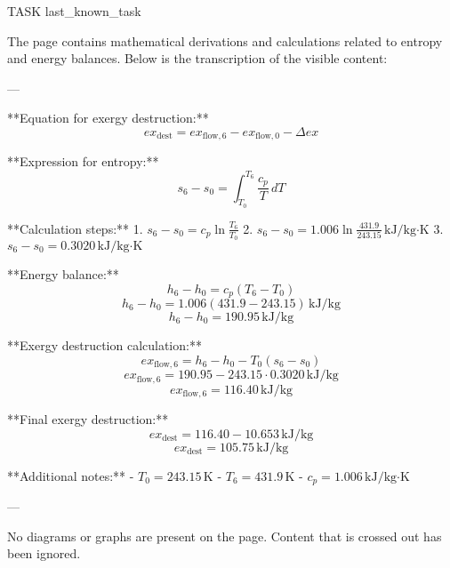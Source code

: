 TASK {last_known_task}

The page contains mathematical derivations and calculations related to entropy and energy balances. Below is the transcription of the visible content:

---

**Equation for exergy destruction:**
\[
ex_{\text{dest}} = ex_{\text{flow},6} - ex_{\text{flow},0} - \Delta ex
\]

**Expression for entropy:**
\[
s_6 - s_0 = \int_{T_0}^{T_6} \frac{c_p}{T} \, dT
\]

**Calculation steps:**
1. \( s_6 - s_0 = c_p \ln \frac{T_6}{T_0} \)
2. \( s_6 - s_0 = 1.006 \ln \frac{431.9}{243.15} \, \text{kJ/kg·K} \)
3. \( s_6 - s_0 = 0.3020 \, \text{kJ/kg·K} \)

**Energy balance:**
\[
h_6 - h_0 = c_p (T_6 - T_0)
\]
\[
h_6 - h_0 = 1.006 (431.9 - 243.15) \, \text{kJ/kg}
\]
\[
h_6 - h_0 = 190.95 \, \text{kJ/kg}
\]

**Exergy destruction calculation:**
\[
ex_{\text{flow},6} = h_6 - h_0 - T_0 (s_6 - s_0)
\]
\[
ex_{\text{flow},6} = 190.95 - 243.15 \cdot 0.3020 \, \text{kJ/kg}
\]
\[
ex_{\text{flow},6} = 116.40 \, \text{kJ/kg}
\]

**Final exergy destruction:**
\[
ex_{\text{dest}} = 116.40 - 10.653 \, \text{kJ/kg}
\]
\[
ex_{\text{dest}} = 105.75 \, \text{kJ/kg}
\]

**Additional notes:**
- \( T_0 = 243.15 \, \text{K} \)
- \( T_6 = 431.9 \, \text{K} \)
- \( c_p = 1.006 \, \text{kJ/kg·K} \)

---

No diagrams or graphs are present on the page. Content that is crossed out has been ignored.